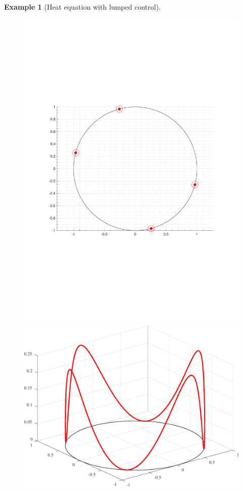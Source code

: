 \documentclass[journal,twoside,web]{ieeecolor}
\newtheorem{example}{Example}
\begin{document}
\begin{example}[Heat equation with lumped control]
	\begin{figure}
	\includegraphics[scale=0.265]{figures/heat_opt}
	\hspace{0.1cm}
	\includegraphics[scale=0.265]{figures/heat}

\end{figure}
\end{example}
\end{document}
